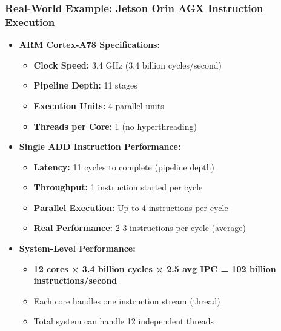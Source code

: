 \begin{frame}
\frametitle{Real-World Example: Jetson Orin AGX Instruction Execution}
\begin{itemize}
    \item \textbf{ARM Cortex-A78 Specifications:}
    \begin{itemize}
        \item \textbf{Clock Speed:} 3.4 GHz (3.4 billion cycles/second)
        \item \textbf{Pipeline Depth:} 11 stages
        \item \textbf{Execution Units:} 4 parallel units
        \item \textbf{Threads per Core:} 1 (no hyperthreading)
    \end{itemize}
    \item \textbf{Single ADD Instruction Performance:}
    \begin{itemize}
        \item \textbf{Latency:} 11 cycles to complete (pipeline depth)
        \item \textbf{Throughput:} 1 instruction started per cycle
        \item \textbf{Parallel Execution:} Up to 4 instructions per cycle
        \item \textbf{Real Performance:} 2-3 instructions per cycle (average)
    \end{itemize}
    \item \textbf{System-Level Performance:}
    \begin{itemize}
        \item \textbf{12 cores × 3.4 billion cycles × 2.5 avg IPC = 102 billion instructions/second}
        \item Each core handles one instruction stream (thread)
        \item Total system can handle 12 independent threads
    \end{itemize}
\end{itemize}
\end{frame}

